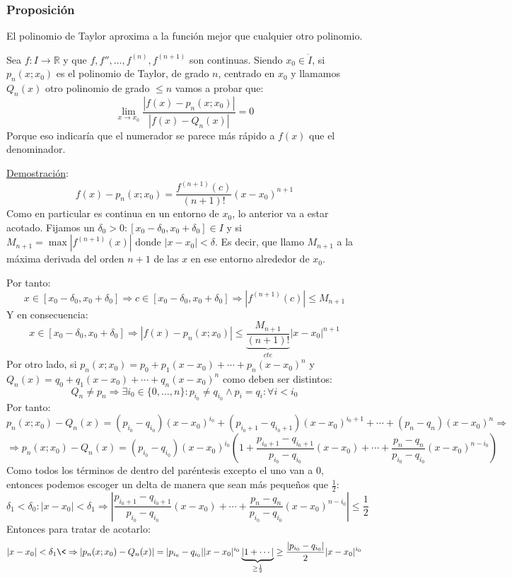 \documentclass[10pt,a4paper,openright]{book}
\begin{document}
\subsubsection*{Proposición}
El polinomio de Taylor aproxima a la función mejor que cualquier otro polinomio.

Sea $f: I\rightarrow\mathbb R$ y que $f, f'', ..., f^{(n)}, f^{(n+1)}$ son continuas. Siendo $x_0\in \mathring{I}$, si $p_n(x;x_0)$ es el polinomio de Taylor, de grado $n$, centrado en $x_0$ y llamamos $Q_n(x)$ otro polinomio de grado $\leq n$ vamos a probar que:
$$\lim_{x\rightarrow x_0}\frac{|f(x)-p_n(x;x_0)|}{|f(x)-Q_n(x)|}=0$$
Porque eso indicaría que el numerador se parece más rápido a $f(x)$ que el denominador.

\underline{Demostración}:
$$f(x)-p_n(x;x_0)=\frac{f^{(n+1)}(c)}{(n+1)!}(x-x_0)^{n+1}$$
Como en particular es continua en un entorno de $x_0$, lo anterior va a estar acotado. Fijamos un $\delta_0>0 : [x_0-\delta_0, x_0+\delta_0]\in I$ y si $M_{n+1}=\max |f^{(n+1)}(x)|$ donde $|x-x_0|<\delta$. Es decir, que llamo $M_{n+1}$ a la máxima derivada del orden $n+1$ de las $x$ en ese entorno alrededor de $x_0$. 

Por tanto:
$$x\in [x_0-\delta_0, x_0+\delta_0]\Rightarrow c\in [x_0-\delta_0, x_0+\delta_0] \Rightarrow |f^{(n+1)}(c)|\leq M_{n+1}$$
Y en consecuencia:
$$x\in [x_0-\delta_0, x_0+\delta_0]\Rightarrow |f(x)-p_n(x;x_0)|\leq \underbrace{\frac{M_{n+1}}{(n+1)!}}_{cte}|x-x_0|^{n+1}$$
Por otro lado, si $p_n(x;x_0)=p_0+p_1(x-x_0)+\cdots +p_n(x-x_0)^n$ y $Q_n(x)=q_0+q_1(x-x_0)+\cdots +q_n(x-x_0)^n$ como deben ser distintos:
$$Q_n\neq p_n\Rightarrow \exists i_0\in \{0, ..., n\}: p_{i_0}\neq q_{i_0}\wedge p_i=q_i:\forall i < i_0$$
Por tanto:
$$p_n(x;x_0)-Q_n(x)=(p_{i_0}-q_{i_0})(x-x_0)^{i_0}+(p_{i_0+1}-q_{i_0+1})(x-x_0)^{i_0+1}+\cdots + (p_n-q_n)(x-x_0)^{n}\Rightarrow $$
$$\Rightarrow p_n(x;x_0)-Q_n(x)=(p_{i_0}-q_{i_0})(x-x_0)^{i_0}\left( 1+ \frac{p_{i_0+1}-q_{i_0+1}}{p_{i_0}-q_{i_0}}(x-x_0)+\cdots + \frac{p_n-q_n}{p_{i_0}-q_{i_0}}(x-x_0)^{n-i_0}\right)$$
Como todos los términos de dentro del paréntesis excepto el uno van a 0, entonces podemos escoger un delta de manera que sean más pequeños que $\frac{1}{2}$:
$$\delta_1< \delta_0: |x-x_0|<\delta_1\Rightarrow \left| \frac{p_{i_0+1}-q_{i_0+1}}{p_{i_0}-q_{i_0}}(x-x_0)+\cdots + \frac{p_n-q_n}{p_{i_0}-q_{i_0}}(x-x_0)^{n-i_0}\right|\leq \frac{1}{2}$$
Entonces para tratar de acotarlo:
$$|x-x_0|<\delta_1\<\Rightarrow|p_n(x;x_0)-Q_n(x)|=|p_{i_0}-q_{i_0}||x-x_0|^{i_0}\underbrace{\left| 1 + \cdots \right|}_{\geq \frac{1}{2}}\geq \frac{|p_{i_0}-q_{i_0}|}{2}|x-x_0|^{i_0}$$
\end{document}
